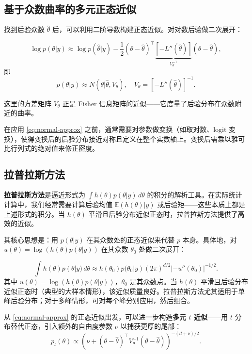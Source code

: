 \subsection{基于众数曲率的多元正态近似}\label{sec:normal-at-mode}

找到后验众数 $\hat{\theta}$ 后，可以利用二阶导数构建正态近似。对对数后验做二次展开：

\[
\log p(\theta|y) \approx \log p(\hat{\theta}|y) - \frac{1}{2}(\theta - \hat{\theta})^\top \underbrace{[-L''(\hat{\theta})]}_{V_\theta^{-1}} (\theta - \hat{\theta}),
\]
即
\begin{equation}\label{eq:normal-approx}
p(\theta|y) \approx N(\theta | \hat{\theta}, V_\theta), \quad V_\theta = [-L''(\hat{\theta})]^{-1}.
\end{equation}

这里的方差矩阵 $V_\theta$ 正是 Fisher 信息矩阵的近似——它度量了后验分布在众数附近的曲率。

\begin{Remark}[参数变换]
在应用 \cref{eq:normal-approx} 之前，通常需要对参数做变换（如取对数、logit 变换），使得变换后的后验分布接近对称且定义在整个实数轴上。变换后需乘以雅可比行列式的绝对值来修正密度。
\end{Remark}

\subsection{拉普拉斯方法}\label{sec:laplace-method}

\textbf{拉普拉斯方法}是逼近形式为 $\int h(\theta)p(\theta|y)\,d\theta$ 的积分的解析工具。在实际统计计算中，我们经常需要计算后验均值 $\mathbb{E}(h(\theta)|y)$ 或后验矩——这些本质上都是上述形式的积分。当 $h(\theta)$ 平滑且后验分布近似正态时，拉普拉斯方法提供了高效的近似。

其核心思想是：用 $p(\theta|y)$ 在其众数处的正态近似来代替 $p$ 本身。具体地，对 $u(\theta) = \log(h(\theta)p(\theta|y))$ 在其众数 $\theta_0$ 处做二次展开：

\[
\int h(\theta)p(\theta|y)\,d\theta \approx h(\theta_0)p(\theta_0|y)(2\pi)^{d/2} | -u''(\theta_0) |^{-1/2}.
\label{eq:laplace-integral-approx}
\]
其中 $u(\theta) = \log(h(\theta)p(\theta|y))$，$\theta_0$ 是其众数点。当 $h(\theta)$ 平滑且后验分布近似正态时（典型的大样本情形），该近似质量良好。拉普拉斯方法尤其适用于单峰后验分布；对于多峰情形，可对每个峰分别应用，然后组合。

从 \cref{eq:normal-approx} 的正态近似出发，可以进一步构造\textbf{多元 $t$ 近似}——用 $t$ 分布替代正态，引入额外的自由度参数 $\nu$ 以捕获更厚的尾部：
\[
p_t(\theta) \propto \left( \nu + (\theta - \hat{\theta})^\top V_\theta^{-1} (\theta - \hat{\theta}) \right)^{-(d+\nu)/2}.
\]

